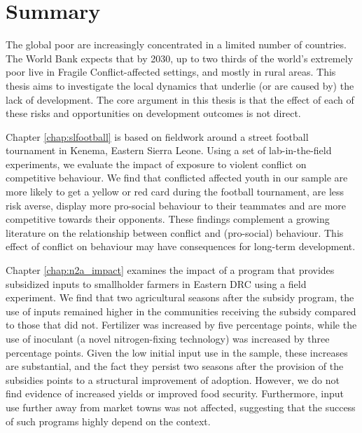 \clearpage
{}
\chapter*{Summary}

The global poor are increasingly concentrated in a limited number of countries. The World Bank expects that by 2030, up to two thirds of the world's extremely poor live in Fragile Conflict-affected settings, and mostly in rural areas. This thesis aims to investigate the local dynamics that underlie (or are caused by) the lack of development. The core argument in this thesis is that the effect of each of these risks and opportunities on development outcomes is not direct. 

Chapter \ref{chap:slfootball} is based on fieldwork around a street football tournament in Kenema, Eastern Sierra Leone. Using a set of lab-in-the-field experiments, we evaluate the impact of exposure to violent conflict on competitive behaviour. We find that conflicted affected youth in our sample are more likely to get a yellow or red card during the football tournament, are less risk averse, display more pro-social behaviour to their teammates and are more competitive towards their opponents. These findings complement a growing literature on the relationship between conflict and (pro-social) behaviour. This effect of conflict on behaviour may have consequences for long-term development.

Chapter \ref{chap:n2a_impact} examines the impact of a program that provides subsidized inputs to smallholder farmers in Eastern DRC using a field experiment. We find that two agricultural seasons after the subsidy program, the use of inputs remained higher in the communities receiving the subsidy compared to those that did not. Fertilizer was increased by five percentage points, while the use of inoculant (a novel nitrogen-fixing technology) was increased by three percentage points. Given the low initial input use in the sample, these increases are substantial, and the fact they persist two seasons after the provision of the subsidies points to a structural improvement of adoption. However, we do not find evidence of increased yields or improved food security. Furthermore, input use further away from market towns was not affected, suggesting that the success of such programs highly depend on the context.

